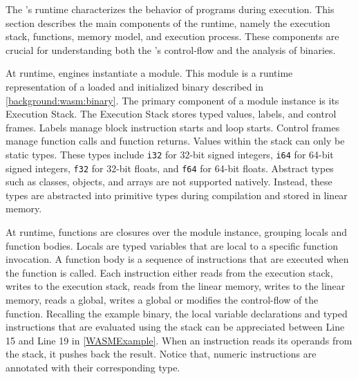 \label{background:wasm:execution}

The \Wasm's runtime characterizes the behavior of \Wasm programs during execution. 
This section describes the main components of the \Wasm runtime, namely the execution stack, functions, memory model, and execution process. 
These components are crucial for understanding both the \Wasm's control-flow and the analysis of \Wasm binaries.


 At runtime, \Wasm engines instantiate a \Wasm module. 
This module is a runtime representation of a loaded and initialized \Wasm binary described in \autoref{background:wasm:binary}. 
The primary component of a module instance is its Execution Stack. 
The Execution Stack stores typed values, labels, and control frames. 
Labels manage block instruction starts and loop starts.
Control frames manage function calls and function returns.
Values within the stack can only be static types.
These types include \texttt{i32} for 32-bit signed integers, \texttt{i64} for 64-bit signed integers, \texttt{f32} for 32-bit floats, and \texttt{f64} for 64-bit floats. 
Abstract types such as classes, objects, and arrays are not supported natively. 
Instead, these types are abstracted into primitive types during compilation and stored in linear memory.


 At runtime, \Wasm functions are closures over the module instance, grouping locals and function bodies.
Locals are typed variables that are local to a specific function invocation.
A function body is a sequence of instructions that are executed when the function is called.
Each instruction either reads from the execution stack, writes to the execution stack, reads from the linear memory, writes to the linear memory, reads a global, writes a global or modifies the control-flow of the function.
Recalling the example \Wasm binary, the local variable declarations and typed instructions that are evaluated using the stack can be appreciated between Line 15 and Line 19 in \autoref{WASMExample}. 
When an instruction reads its operands from the stack, it pushes back the result. 
Notice that, numeric instructions are annotated with their corresponding type.



